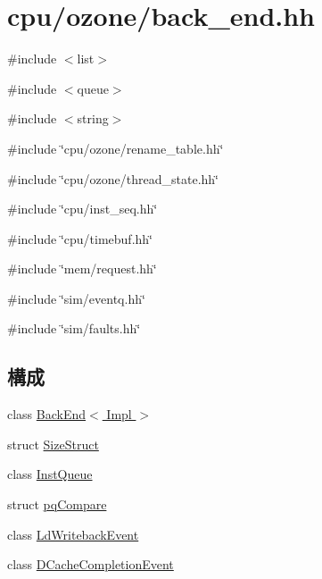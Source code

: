 \hypertarget{back__end_8hh}{
\section{cpu/ozone/back\_\-end.hh}
\label{back__end_8hh}
}
{\ttfamily \#include $<$list$>$}\par
{\ttfamily \#include $<$queue$>$}\par
{\ttfamily \#include $<$string$>$}\par
{\ttfamily \#include \char`\"{}cpu/ozone/rename\_\-table.hh\char`\"{}}\par
{\ttfamily \#include \char`\"{}cpu/ozone/thread\_\-state.hh\char`\"{}}\par
{\ttfamily \#include \char`\"{}cpu/inst\_\-seq.hh\char`\"{}}\par
{\ttfamily \#include \char`\"{}cpu/timebuf.hh\char`\"{}}\par
{\ttfamily \#include \char`\"{}mem/request.hh\char`\"{}}\par
{\ttfamily \#include \char`\"{}sim/eventq.hh\char`\"{}}\par
{\ttfamily \#include \char`\"{}sim/faults.hh\char`\"{}}\par
\subsection*{構成}
\begin{DoxyCompactItemize}
\item 
class \hyperlink{classBackEnd}{BackEnd$<$ Impl $>$}
\item 
struct \hyperlink{structBackEnd_1_1SizeStruct}{SizeStruct}
\item 
class \hyperlink{classBackEnd_1_1InstQueue}{InstQueue}
\item 
struct \hyperlink{structBackEnd_1_1InstQueue_1_1pqCompare}{pqCompare}
\item 
class \hyperlink{classBackEnd_1_1LdWritebackEvent}{LdWritebackEvent}
\item 
class \hyperlink{classBackEnd_1_1DCacheCompletionEvent}{DCacheCompletionEvent}
\end{DoxyCompactItemize}
